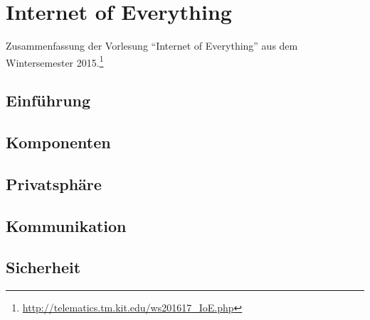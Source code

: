 \chapter{Internet of Everything}

Zusammenfassung der Vorlesung "`Internet of Everything"' aus dem Wintersemester 2015.\footnote{\url{http://telematics.tm.kit.edu/ws201617_IoE.php}}

\section{Einführung}



\section{Komponenten}



\section{Privatsphäre}



\section{Kommunikation}



\section{Sicherheit}